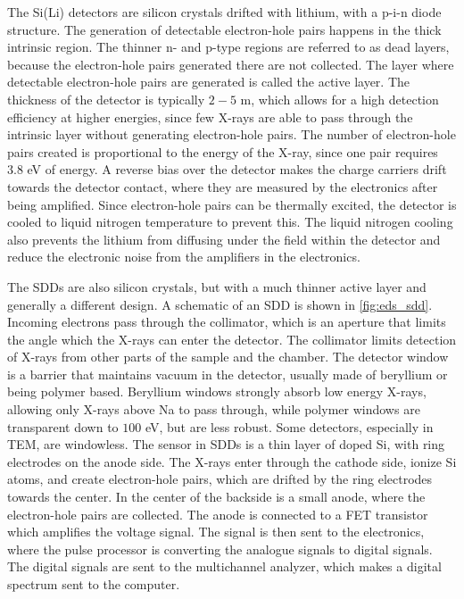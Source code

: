 The Si(Li) detectors are silicon crystals drifted with lithium, with a p-i-n diode structure.
The generation of detectable electron-hole pairs happens in the thick intrinsic region.
The thinner n- and p-type regions are referred to as dead layers, because the electron-hole pairs generated there are not collected.
The layer where detectable electron-hole pairs are generated is called the active layer.
The thickness of the detector is typically $2-5$ \textmu m, which allows for a high detection efficiency at higher energies, since few X-rays are able to pass through the intrinsic layer without generating electron-hole pairs.
The number of electron-hole pairs created is proportional to the energy of the X-ray, since one pair requires $3.8$ eV of energy.
A reverse bias over the detector makes the charge carriers drift towards the detector contact, where they are measured by the electronics after being amplified.
Since electron-hole pairs can be thermally excited, the detector is cooled to liquid nitrogen temperature to prevent this.
The liquid nitrogen cooling also prevents the lithium from diffusing under the field within the detector and reduce the electronic noise from the amplifiers in the electronics.

The SDDs are also silicon crystals, but with a much thinner active layer and generally a different design.
A schematic of an SDD is shown in \cref{fig:eds_sdd}.
Incoming electrons pass through the collimator, which is an aperture that limits the angle which the X-rays can enter the detector.
The collimator limits detection of X-rays from other parts of the sample and the chamber.
The detector window is a barrier that maintains vacuum in the detector, usually made of beryllium or being polymer based.
Beryllium windows strongly absorb low energy X-rays, allowing only X-rays above Na to pass through, while polymer windows are transparent down to $100$ eV, but are less robust.
Some detectors, especially in TEM, are windowless.
The sensor in SDDs is a thin layer of doped Si, with ring electrodes on the anode side.
The X-rays enter through the cathode side, ionize Si atoms, and create electron-hole pairs, which are drifted by the ring electrodes towards the center.
In the center of the backside is a small anode, where the electron-hole pairs are collected.
The anode is connected to a FET transistor which amplifies the voltage signal.
The signal is then sent to the electronics, where the pulse processor is converting the analogue signals to digital signals.
The digital signals are sent to the multichannel analyzer, which makes a digital spectrum sent to the computer.


